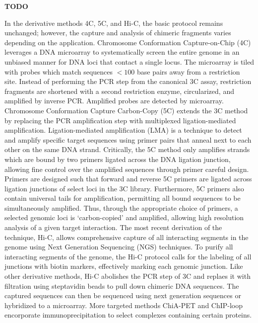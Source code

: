 \documentclass[phd,tocprelim]{cornell}
\begin{document}
\textbf{TODO}
%
%

In the derivative methods 4C, 5C, and Hi-C, the basic protocol remains
unchanged; however, the capture and analysis of chimeric fragments varies
depending on the application.  Chromosome Conformation Capture-on-Chip (4C)
leverages a DNA microarray to systematically screen the entire genome in an
unbiased manner for DNA loci that contact a single locus\cite{simonis2006}.
The microarray is tiled with probes which match sequences $< 100$ base pairs
away from a restriction site.  Instead of performing the PCR step from the
canonical 3C assay, restriction fragments are shortened with a second restriction
enzyme, circularized, and amplified by inverse PCR\@.  Amplified probes
are detected by microarray\cite{simonis2006}.  Chromosome Conformation Capture Carbon-Copy (5C)
extends the 3C method by replacing the PCR amplification step with multiplexed
ligation-mediated amplification.  Ligation-mediated amplification (LMA) is a
technique to detect and amplify specific target sequences using primer pairs
that anneal next to each other on the same DNA strand\cite{dostie2006}.
Critically, the 5C method only amplifies strands which are bound by two
primers ligated across the DNA ligation junction, allowing fine control over
the amplified sequences through primer careful design.  Primers are
designed such that forward and reverse 5C primers are ligated across ligation
junctions of select loci in the 3C library.
Furthermore, 5C primers also contain universal tails for amplification,
permitting all bound sequences to be simultaneously amplified.  Thus, through
the appropriate choice of primers, a selected genomic loci is `carbon-copied'
and amplified, allowing high resolution analysis of a given target
interaction\cite{dostie2006}.  The most recent derivation of the technique,
Hi-C, allows comprehensive capture of all interacting segments in the genome
using Next Generation Sequencing (NGS) techniques.  To purify all interacting
segments of the genome, the Hi-C protocol calls for the labeling of all junctions
with biotin markers, effectively marking each genomic junction. Like other
derivative methods, Hi-C abolishes the PCR step of 3C and replaes it with filtration
using steptavidin beads to pull down chimeric DNA sequences.  The captured sequences
can then be sequenced using next generation sequences or hybridized to a
microarray.  More targeted methods ChiA-PET and ChIP-loop encorporate
immunoprecipitation to select complexes containing certain proteins.
\end{document}
